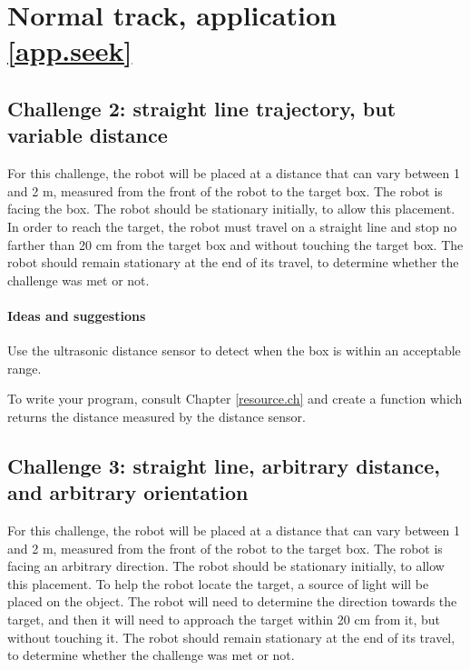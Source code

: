 \documentclass[12pt]{book}
\begin{document}

\section{Normal track, application \ref{app.seek}}

\subsection{Challenge 2: straight line trajectory, but variable distance}
\label{proj2:chap} 

For this challenge, the robot will be placed at a distance that can
vary between 1 and 2 m, measured from the front of the robot to the
target box. The robot is facing the box. The robot should be stationary
initially, to allow this placement. In order to reach the target, the
robot must travel on a straight line and stop no farther than 20 cm
from the target box and without touching the target box. The robot
should remain stationary at the end of its travel, to determine whether
the challenge was met or not.

\paragraph{Ideas and suggestions}

\begin{compactenum}[1)]
\item Use the ultrasonic distance sensor to detect when the box is
  within an acceptable range.
  \item To write your program, consult Chapter \ref{resource.ch} and create a function which returns the distance
    measured by the distance sensor.
\end{compactenum}



\subsection{Challenge 3: straight line, arbitrary distance, and arbitrary
orientation}

For this challenge, the robot will be placed at a distance that can
vary between 1 and 2 m, measured from the front of the robot to the
target box. The robot is facing an arbitrary direction. The robot
should be stationary initially, to allow this placement. To help the
robot locate the target, a source of light will be placed on the
object. The robot will need to determine the direction towards the
target, and then it will need to approach the target within 20 cm from
it, but without touching it. The robot should remain
stationary at the end of its travel, to determine whether the challenge
was met or not.
\end{document}
